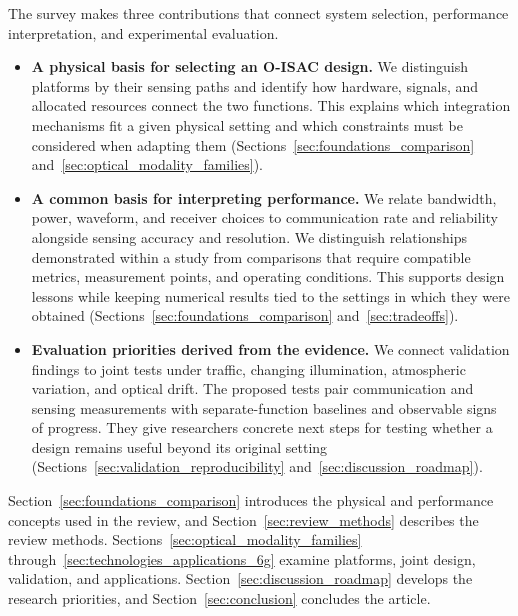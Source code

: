 The survey makes three contributions that connect system selection,
performance interpretation, and experimental evaluation.
\begin{itemize}
\item \textbf{A physical basis for selecting an O-ISAC design.}
We distinguish platforms by their sensing paths and identify how hardware,
signals, and allocated resources connect the two functions. This explains
which integration mechanisms fit a given physical setting and which
constraints must be considered when adapting them
(Sections~\ref{sec:foundations_comparison}
and~\ref{sec:optical_modality_families}).

\item \textbf{A common basis for interpreting performance.}
We relate bandwidth, power, waveform, and receiver choices to communication
rate and reliability alongside sensing accuracy and resolution. We distinguish
relationships demonstrated within a study from comparisons that require
compatible metrics, measurement points, and operating conditions. This
supports design lessons while keeping numerical results tied to the settings
in which they were obtained
(Sections~\ref{sec:foundations_comparison} and~\ref{sec:tradeoffs}).

\item \textbf{Evaluation priorities derived from the evidence.}
We connect validation findings to joint tests under traffic, changing
illumination, atmospheric variation, and optical drift. The proposed tests
pair communication and sensing measurements with separate-function baselines
and observable signs of progress. They give researchers concrete next steps
for testing whether a design remains useful beyond its original setting
(Sections~\ref{sec:validation_reproducibility}
and~\ref{sec:discussion_roadmap}).
\end{itemize}

Section~\ref{sec:foundations_comparison} introduces the physical and performance
concepts used in the review, and Section~\ref{sec:review_methods} describes the
review methods. Sections~\ref{sec:optical_modality_families}
through~\ref{sec:technologies_applications_6g} examine platforms, joint design,
validation, and applications. Section~\ref{sec:discussion_roadmap} develops the
research priorities, and Section~\ref{sec:conclusion} concludes the article.

\FloatBarrier
